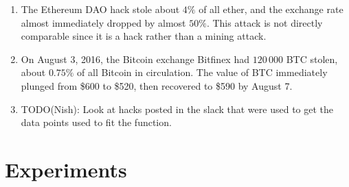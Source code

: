 \documentclass[12pt]{article}
\begin{document}
\begin{enumerate}
  \item
    The Ethereum DAO hack stole about $4\%$ of all ether, and the exchange rate
    almost immediately dropped by almost $50\%$.
    This attack is not directly comparable since it is a hack rather than a
    mining attack.
  \item
    On August 3, 2016, the Bitcoin exchange Bitfinex had $120\,000$ BTC stolen, about $0.75\%$ of all Bitcoin in circulation. The value of BTC immediately plunged from \$600 to \$520, then recovered to \$590 by August 7.
  \item
  TODO(Nish): Look at hacks posted in the slack that were used to get the data points used to fit the function.
\end{enumerate}

\section{Experiments}
\end{document}
